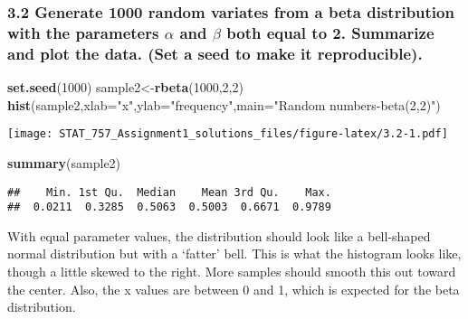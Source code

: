 \documentclass[]{article}
\newenvironment{Shaded}{\begin{snugshade}}{\end{snugshade}}
\newcommand{\DataTypeTok}[1]{\textcolor[rgb]{0.13,0.29,0.53}{#1}}
\newcommand{\DecValTok}[1]{\textcolor[rgb]{0.00,0.00,0.81}{#1}}
\newcommand{\KeywordTok}[1]{\textcolor[rgb]{0.13,0.29,0.53}{\textbf{#1}}}
\newcommand{\NormalTok}[1]{#1}
\newcommand{\StringTok}[1]{\textcolor[rgb]{0.31,0.60,0.02}{#1}}
\begin{document}
\hypertarget{generate-1000-random-variates-from-a-beta-distribution-with-the-parameters-alpha-and-beta-both-equal-to-2.-summarize-and-plot-the-data.-set-a-seed-to-make-it-reproducible.}{%
\subsubsection{\texorpdfstring{3.2 Generate 1000 random variates from a
beta distribution with the parameters \(\alpha\) and \(\beta\) both
equal to 2. Summarize and plot the data. (Set a seed to make it
reproducible).}{3.2 Generate 1000 random variates from a beta distribution with the parameters \textbackslash{}alpha and \textbackslash{}beta both equal to 2. Summarize and plot the data. (Set a seed to make it reproducible).}}\label{generate-1000-random-variates-from-a-beta-distribution-with-the-parameters-alpha-and-beta-both-equal-to-2.-summarize-and-plot-the-data.-set-a-seed-to-make-it-reproducible.}}

\begin{Shaded}
\begin{Highlighting}[]
\KeywordTok{set.seed}\NormalTok{(}\DecValTok{1000}\NormalTok{)}
\NormalTok{sample2<-}\KeywordTok{rbeta}\NormalTok{(}\DecValTok{1000}\NormalTok{,}\DecValTok{2}\NormalTok{,}\DecValTok{2}\NormalTok{)}
\KeywordTok{hist}\NormalTok{(sample2,}\DataTypeTok{xlab=}\StringTok{"x"}\NormalTok{,}\DataTypeTok{ylab=}\StringTok{"frequency"}\NormalTok{,}\DataTypeTok{main=}\StringTok{"Random numbers-beta(2,2)"}\NormalTok{)}
\end{Highlighting}
\end{Shaded}

\texttt{[image: STAT\_757\_Assignment1\_solutions\_files/figure-latex/3.2-1.pdf]}

\begin{Shaded}
\begin{Highlighting}[]
\KeywordTok{summary}\NormalTok{(sample2)}
\end{Highlighting}
\end{Shaded}

\begin{verbatim}
##    Min. 1st Qu.  Median    Mean 3rd Qu.    Max. 
##  0.0211  0.3285  0.5063  0.5003  0.6671  0.9789
\end{verbatim}

With equal parameter values, the distribution should look like a
bell-shaped normal distribution but with a `fatter' bell. This is what
the histogram looks like, though a little skewed to the right. More
samples should smooth this out toward the center. Also, the x values are
between 0 and 1, which is expected for the beta distribution.
\end{document}
